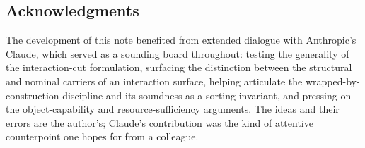 \documentclass[11pt]{article}
\theoremstyle{definition}
\theoremstyle{plain}
\begin{document}
\subsection*{Acknowledgments}

The development of this note benefited from extended dialogue with
Anthropic's Claude, which served as a sounding board throughout: testing
the generality of the interaction-cut formulation, surfacing the
distinction between the structural and nominal carriers of an interaction
surface, helping articulate the wrapped-by-construction discipline and its
soundness as a sorting invariant, and pressing on the object-capability
and resource-sufficiency arguments. The ideas and their errors are the
author's; Claude's contribution was the kind of attentive counterpoint one
hopes for from a colleague.
\end{document}
